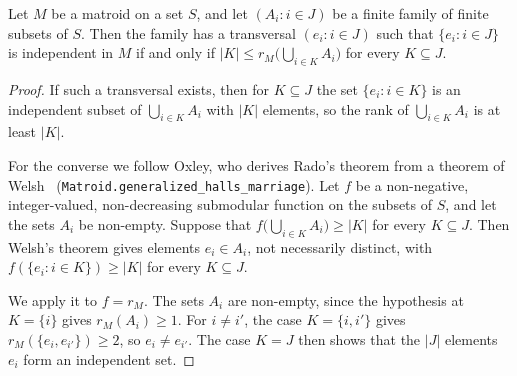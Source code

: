 \begin{lemma}
  \label{lem:rado}
  \leanok
  Let $M$ be a matroid on a set $S$, and let $(A_i : i \in J)$ be a
  finite family of finite subsets of $S$. Then the family has a
  transversal $(e_i : i \in J)$ such that $\{e_i : i \in J\}$ is
  independent in $M$ if and only if
  $|K| \le r_M\bigl(\bigcup_{i \in K} A_i\bigr)$ for every
  $K \subseteq J$.
\end{lemma}
\begin{proof}
  \leanok
  If such a transversal exists, then for $K \subseteq J$ the set
  $\{e_i : i \in K\}$ is an independent subset of
  $\bigcup_{i \in K} A_i$ with $|K|$ elements, so the rank of
  $\bigcup_{i \in K} A_i$ is at least $|K|$.

  For the converse we follow Oxley, who derives Rado's theorem from a
  theorem of Welsh~\cite[Theorem~11.2.3]{oxley2011}
  (\texttt{Matroid.\allowbreak{}generalized\_\allowbreak{}halls\_\allowbreak{}marriage}). Let $f$ be a
  non-negative, integer-valued, non-decreasing submodular function on
  the subsets of $S$, and let the sets $A_i$ be non-empty. Suppose that
  $f\bigl(\bigcup_{i \in K} A_i\bigr) \ge |K|$ for every
  $K \subseteq J$. Then Welsh's theorem gives elements $e_i \in A_i$,
  not necessarily distinct, with $f(\{e_i : i \in K\}) \ge |K|$ for
  every $K \subseteq J$.

  We apply it to $f = r_M$. The sets $A_i$ are non-empty, since the
  hypothesis at $K = \{i\}$ gives $r_M(A_i) \ge 1$. For $i \ne i'$, the
  case $K = \{i, i'\}$ gives $r_M(\{e_i, e_{i'}\}) \ge 2$, so
  $e_i \ne e_{i'}$. The case $K = J$ then shows that the $|J|$ elements
  $e_i$ form an independent set.
\end{proof}

